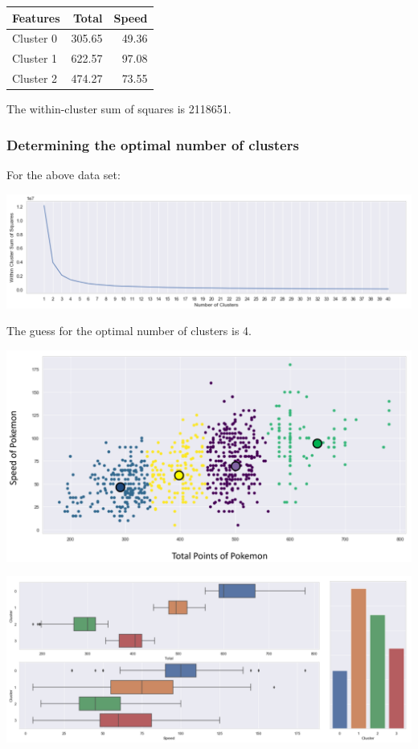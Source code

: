 \documentclass[11pt]{article}
\begin{document}
\begin{center}
\begin{tabular}{lrr}
Features & Total & Speed\\
\hline
Cluster 0 & 305.65 & 49.36\\
Cluster 1 & 622.57 & 97.08\\
Cluster 2 & 474.27 & 73.55\\
\end{tabular}
\end{center}

The within-cluster sum of squares is 2118651.

 \newpage
\subsubsection{Determining the optimal number of clusters}
\label{sec:orgac50b5c}
For the above data set:
\begin{center}
\includegraphics[width=.9\linewidth]{./images/within-cluster-sum-of-squares-graph.png}
\end{center}

The guess for the optimal number of clusters is 4.

\begin{center}
\includegraphics[width=.9\linewidth]{./images/result-of-optimal-number-of-clusters.png}
\end{center}

\begin{center}
\includegraphics[width=.9\linewidth]{./images/box-plot-of-the-optimal-number-of-clusters.png}
\end{center}
\end{document}
